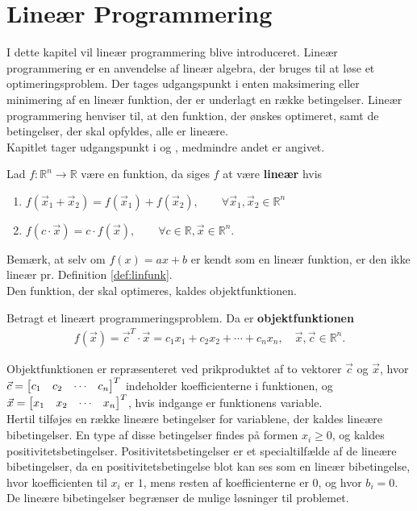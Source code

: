 \chapter{Lineær Programmering}\label{afsnit:linprog}
I dette kapitel vil lineær programmering blive introduceret.
Lineær programmering er en anvendelse af lineær algebra, der bruges til at løse et optimeringsproblem. Der tages udgangspunkt i enten maksimering eller minimering af en lineær funktion, der er underlagt en række betingelser. 
Lineær programmering henviser til, at den funktion, der ønskes optimeret, samt de betingelser, der skal opfyldes, alle er lineære. \\
Kapitlet tager udgangspunkt i \citep{bert} og \citep{lay}, medmindre andet er angivet. 

\begin{defn}
Lad $f:\mathds{R}^n \to \mathds{R}$ være en funktion, da siges $f$ at være \textbf{lineær} hvis
\begin{enumerate}[label=\alph*]
\item $f(\vec{x}_1 + \vec{x}_2) = f(\vec{x}_1) + f(\vec{x}_2), \qquad \forall \vec{x}_1,\vec{x}_2\in \mathds{R}^n$
\item $f(c\cdot \vec{x}) = c \cdot f(\vec{x}), \qquad \forall c \in \mathds{R}, \vec{x} \in \mathds{R}^n$.
\end{enumerate}
\label{def:linfunk}
\end{defn}

Bemærk, at selv om $f(x) = ax + b$ er kendt som en lineær funktion, er den ikke lineær pr. Definition \ref{def:linfunk}.\\
Den funktion, der skal optimeres, kaldes objektfunktionen.
\begin{defn}
Betragt et lineært programmeringsproblem. Da er \textbf{objektfunktionen}
\begin{align*}
f(\vec{x}) = \vec{c}^T \cdot \vec{x} = c_1x_1 + c_2x_2 + \cdots + c_nx_n, \quad  \vec{x}, \vec{c} \in \mathds{R}^n. 
\end{align*}
\end{defn}

Objektfunktionen er repræsenteret ved prikproduktet af to vektorer $\vec{c}$ og $\vec{x}$, hvor \\
$\vec{c}= \begin{bmatrix} c_1 & c_2 & \cdots & c_n \end{bmatrix}^T$ indeholder koefficienterne i funktionen, og $\vec{x}= \begin{bmatrix} x_1 & x_2 & \cdots & x_n \end{bmatrix}^T$, hvis indgange er funktionens variable. \\
Hertil tilføjes en række lineære betingelser for variablene, der kaldes lineære bibetingelser. 
En type af disse betingelser findes på formen $x_i \geq 0$, og kaldes positivitetsbetingelser. Positivitetsbetingelser er et specialtilfælde af de lineære bibetingelser, da en positivitetsbetingelse blot kan ses som en lineær bibetingelse, hvor koefficienten til $x_i$ er $1$, mens resten af koefficienterne er $0$, og hvor $b_i=0$. \\
De lineære bibetingelser begrænser de mulige løsninger til problemet.

